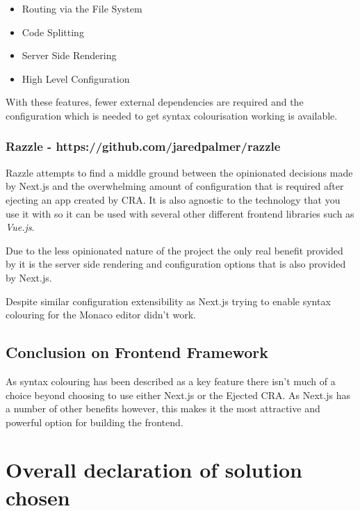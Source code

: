 \begin{itemize}
    \item Routing via the File System
    \item Code Splitting
    \item Server Side Rendering
    \item High Level Configuration
\end{itemize}

With these features, fewer external dependencies are required and the configuration which is needed to get syntax colourisation working is available. 

\subsubsection{Razzle - https://github.com/jaredpalmer/razzle}

Razzle attempts to find a middle ground between the opinionated decisions made by Next.js and the overwhelming amount of configuration that is required after ejecting an app created by CRA. It is also agnostic to the technology that you use it with so it can be used with several other different frontend libraries such as \textit{Vue.js}.

Due to the less opinionated nature of the project the only real benefit provided by it is the server side rendering and configuration options that is also provided by Next.js.

Despite similar configuration extensibility as Next.js trying to enable syntax colouring for the Monaco editor didn't work.

\subsection{Conclusion on Frontend Framework}

As syntax colouring has been described as a key feature there isn't much of a choice beyond choosing to use either Next.js or the Ejected CRA. As Next.js has a number of other benefits however, this makes it the most attractive and powerful option for building the frontend.

\section{Overall declaration of solution chosen}


\pagebreak
